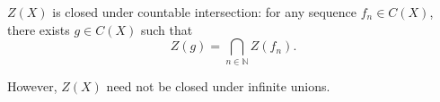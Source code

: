 $Z(X)$ is closed under countable intersection: for any sequence $f_n \in C(X)$, there exists $g \in C(X)$ such that
$$Z(g) = \bigcap_{n \in \mathbb{N}} Z(f_n).$$

However, $Z(X)$ need not be closed under infinite unions.
